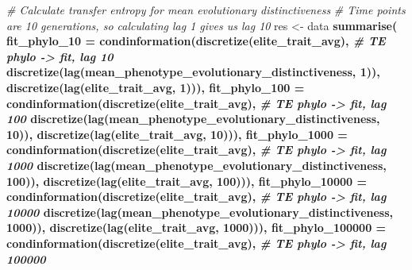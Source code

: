 \documentclass[]{book}
\newenvironment{Shaded}{\begin{snugshade}}{\end{snugshade}}
\newcommand{\CommentTok}[1]{\textcolor[rgb]{0.56,0.35,0.01}{\textit{#1}}}
\newcommand{\DataTypeTok}[1]{\textcolor[rgb]{0.13,0.29,0.53}{#1}}
\newcommand{\DecValTok}[1]{\textcolor[rgb]{0.00,0.00,0.81}{#1}}
\newcommand{\KeywordTok}[1]{\textcolor[rgb]{0.13,0.29,0.53}{\textbf{#1}}}
\newcommand{\NormalTok}[1]{#1}
\newcommand{\OperatorTok}[1]{\textcolor[rgb]{0.81,0.36,0.00}{\textbf{#1}}}
\newcommand{\StringTok}[1]{\textcolor[rgb]{0.31,0.60,0.02}{#1}}
\begin{document}
\begin{Shaded}
\begin{Highlighting}[]
\CommentTok{# Calculate transfer entropy for mean evolutionary distinctiveness}
\CommentTok{# Time points are 10 generations, so calculating lag 1 gives us lag 10}
\NormalTok{res <-}\StringTok{ }\NormalTok{data }\OperatorTok{%
\KeywordTok{summarise}\NormalTok{(}
  \DataTypeTok{fit_phylo_10 =}     \KeywordTok{condinformation}\NormalTok{(}\KeywordTok{discretize}\NormalTok{(elite_trait_avg), }\CommentTok{# TE phylo -> fit, lag 10}
                                     \KeywordTok{discretize}\NormalTok{(}\KeywordTok{lag}\NormalTok{(mean_phenotype_evolutionary_distinctiveness, }\DecValTok{1}\NormalTok{)), }
                                     \KeywordTok{discretize}\NormalTok{(}\KeywordTok{lag}\NormalTok{(elite_trait_avg, }\DecValTok{1}\NormalTok{))),}
  \DataTypeTok{fit_phylo_100 =}    \KeywordTok{condinformation}\NormalTok{(}\KeywordTok{discretize}\NormalTok{(elite_trait_avg), }\CommentTok{# TE phylo -> fit, lag 100}
                                     \KeywordTok{discretize}\NormalTok{(}\KeywordTok{lag}\NormalTok{(mean_phenotype_evolutionary_distinctiveness, }\DecValTok{10}\NormalTok{)), }
                                     \KeywordTok{discretize}\NormalTok{(}\KeywordTok{lag}\NormalTok{(elite_trait_avg, }\DecValTok{10}\NormalTok{))),}
  \DataTypeTok{fit_phylo_1000 =}   \KeywordTok{condinformation}\NormalTok{(}\KeywordTok{discretize}\NormalTok{(elite_trait_avg), }\CommentTok{# TE phylo -> fit, lag 1000}
                                     \KeywordTok{discretize}\NormalTok{(}\KeywordTok{lag}\NormalTok{(mean_phenotype_evolutionary_distinctiveness, }\DecValTok{100}\NormalTok{)), }
                                     \KeywordTok{discretize}\NormalTok{(}\KeywordTok{lag}\NormalTok{(elite_trait_avg, }\DecValTok{100}\NormalTok{))),}
  \DataTypeTok{fit_phylo_10000 =}  \KeywordTok{condinformation}\NormalTok{(}\KeywordTok{discretize}\NormalTok{(elite_trait_avg), }\CommentTok{# TE phylo -> fit, lag 10000}
                                     \KeywordTok{discretize}\NormalTok{(}\KeywordTok{lag}\NormalTok{(mean_phenotype_evolutionary_distinctiveness, }\DecValTok{1000}\NormalTok{)), }
                                     \KeywordTok{discretize}\NormalTok{(}\KeywordTok{lag}\NormalTok{(elite_trait_avg, }\DecValTok{1000}\NormalTok{))),}
  \DataTypeTok{fit_phylo_100000 =} \KeywordTok{condinformation}\NormalTok{(}\KeywordTok{discretize}\NormalTok{(elite_trait_avg), }\CommentTok{# TE phylo -> fit, lag 100000}
}
\end{Highlighting}
\end{Shaded}
\end{document}
